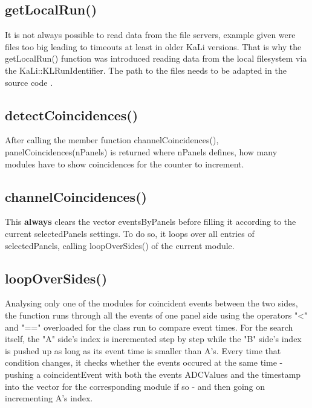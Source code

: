     \subsection{getLocalRun()}
    \label{ch:Analysis software:sec:methods of the class run:subsec:getLocalRun()}
    
    It is not always possible to read data from the file servers, example given were files too big leading to timeouts at least in older KaLi versions. That is why the getLocalRun() function was introduced reading data from the local filesystem via the KaLi::KLRunIdentifier. The path to the files needs to be adapted in the source code .
    
    \subsection{detectCoincidences()}
    \label{ch:Analysis software:sec:methods of the class run:subsec:detectCoincidences()}
    
    After calling the member function channelCoincidences(), panelCoincidences(nPanels) is returned where nPanels defines, how many modules have to show coincidences for the counter to increment. 
    
    \subsection{channelCoincidences()}
    \label{ch:Analysis software:sec:methods of the class run:subsec:channelCoincidences()}
    This {\bf always} clears the vector eventsByPanels before filling it according to the current selectedPanels settings. To do so, it loops over all entries of selectedPanels, calling loopOverSides() of the current module.
    
    \subsection{loopOverSides()}
    \label{ch:Analysis software:sec:methods of the class run:subsec:loopOverSides()}
    
    Analysing only one of the modules for coincident events between the two sides, the function runs through all the events of one panel side using the operators "<" and "==" overloaded for the class run to compare event times. For the search itself, the "A" side's index is incremented step by step while the "B" side's index is pushed up as long as its event time is smaller than A's. Every time that condition changes, it checks whether the events occured at the same time - pushing a coincidentEvent with both the events ADCValues and the timestamp into the vector for the corresponding module if so - and then going on incrementing A's index.
    
